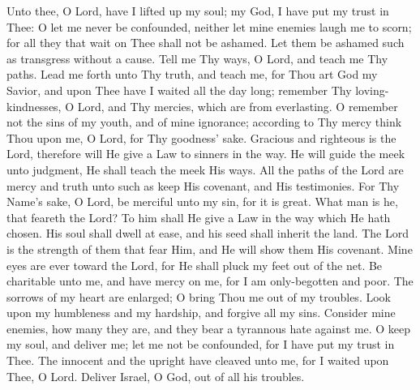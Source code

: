 Unto thee, O Lord, have I lifted up my soul; my God, I have put my trust in Thee: O let me never be confounded, neither let mine enemies laugh me to scorn; for all they that wait on Thee shall not be ashamed. Let them be ashamed such as transgress without a cause. Tell me Thy ways, O Lord, and teach me Thy paths. Lead me forth unto Thy truth, and teach me, for Thou art God my Savior, and upon Thee have I waited all the day long; remember Thy loving-kindnesses, O Lord, and Thy mercies, which are from everlasting. O remember not the sins of my youth, and of mine ignorance; according to Thy mercy think Thou upon me, O Lord, for Thy goodness’ sake. Gracious and righteous is the Lord, therefore will He give a Law to sinners in the way. He will guide the meek unto judgment, He shall teach the meek His ways. All the paths of the Lord are mercy and truth unto such as keep His covenant, and His testimonies. For Thy Name’s sake, O Lord, be merciful unto my sin, for it is great. What man is he, that feareth the Lord? To him shall He give a Law in the way which He hath chosen. His soul shall dwell at ease, and his seed shall inherit the land. The Lord is the strength of them that fear Him, and He will show them His covenant. Mine eyes are ever toward the Lord, for He shall pluck my feet out of the net. Be charitable unto me, and have mercy on me, for I am only-begotten and poor. The sorrows of my heart are enlarged; O bring Thou me out of my troubles. Look upon my humbleness and my hardship, and forgive all my sins. Consider mine enemies, how many they are, and they bear a tyrannous hate against me. O keep my soul, and deliver me; let me not be confounded, for I have put my trust in Thee. The innocent and the upright have cleaved unto me, for I waited upon Thee, O Lord. Deliver Israel, O God, out of all his troubles.
